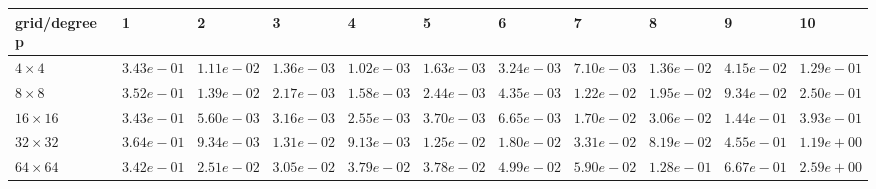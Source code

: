\begin{tabular}{lllllllllll}
\hline
 grid/degree p   & 1          & 2          & 3          & 4          & 5          & 6          & 7          & 8          & 9          & 10         \\
\hline
 $4 \times 4$    & $3.43e-01$ & $1.11e-02$ & $1.36e-03$ & $1.02e-03$ & $1.63e-03$ & $3.24e-03$ & $7.10e-03$ & $1.36e-02$ & $4.15e-02$ & $1.29e-01$ \\
 $8 \times 8$    & $3.52e-01$ & $1.39e-02$ & $2.17e-03$ & $1.58e-03$ & $2.44e-03$ & $4.35e-03$ & $1.22e-02$ & $1.95e-02$ & $9.34e-02$ & $2.50e-01$ \\
 $16 \times 16$  & $3.43e-01$ & $5.60e-03$ & $3.16e-03$ & $2.55e-03$ & $3.70e-03$ & $6.65e-03$ & $1.70e-02$ & $3.06e-02$ & $1.44e-01$ & $3.93e-01$ \\
 $32 \times 32$  & $3.64e-01$ & $9.34e-03$ & $1.31e-02$ & $9.13e-03$ & $1.25e-02$ & $1.80e-02$ & $3.31e-02$ & $8.19e-02$ & $4.55e-01$ & $1.19e+00$ \\
 $64 \times 64$  & $3.42e-01$ & $2.51e-02$ & $3.05e-02$ & $3.79e-02$ & $3.78e-02$ & $4.99e-02$ & $5.90e-02$ & $1.28e-01$ & $6.67e-01$ & $2.59e+00$ \\
\hline
\end{tabular}